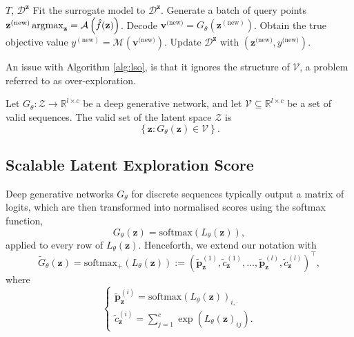\begin{algorithm}
\caption{Latent space optimisation.}\label{alg:lso}
\begin{algorithmic}
\Require $T$, $\mathcal{D}^{\mathbf{z}}$
\State Fit the surrogate model to $\mathcal{D}^{\mathbf{z}}$.
\State Generate a batch of query points $\mathbf{z}^{(\text{new})}\operatorname*{\mathrm{argmax}}_{\mathbf{z}}=\mathcal{A}\left(\hat{f}(\mathbf{z})\right)$.
\State Decode $\mathbf{v}^{\text{(new)}}=G_{\theta}\left(\mathbf{z}^{(\text{new})}\right)$.
\State Obtain the true objective value $y^{(\text{new})}=\mathcal{M}\left(\mathbf{v}^{\text{(new)}}\right)$.
\State Update $\mathcal{D}^\mathbf{z}$ with $\left(\mathbf{z}^{\text{(new)}},y^{\text{(new)}}\right)$.
\EndFor
\end{algorithmic}
\end{algorithm}

An issue with Algorithm \ref{alg:lso}, is that it ignores the structure of $\mathcal{V}$, a problem referred to as over-exploration.

\begin{definition}\label{def:latent_space_valid_set}
    Let $G_{\theta}:\mathcal{Z}\to\mathbb{R}^{l\times c}$ be a deep generative network, and let $\mathcal{V}\subseteq\mathbb{R}^{l\times c}$ be a set of valid sequences. The valid set of the latent space $\mathcal{Z}$ is $$\left\{\mathbf{z}:G_{\theta}(\mathbf{z})\in\mathcal{V}\right\}.$$
\end{definition}

\subsection{Scalable Latent Exploration Score}

Deep generative networks $G_{\theta}$ for discrete sequences typically output a matrix of logits, which are then transformed into normalised scores using the softmax function, $$G_{\theta}(\mathbf{z})=\mathrm{softmax}\left(L_{\theta}(\mathbf{z})\right),$$applied to every row of $L_{\theta}(\mathbf{z})$. Henceforth, we extend our notation with $$\tilde{G}_{\theta}(\mathbf{z})=\mathrm{softmax}_+\left(L_{\theta}(\mathbf{z})\right):=\left(\tilde{\mathbf{p}}_{\mathbf{z}}^{(1)},\tilde{c}_{\mathbf{z}}^{(1)},\dots,\tilde{\mathbf{p}}_{\mathbf{z}}^{(l)},\tilde{c}_{\mathbf{z}}^{(l)}\right)^\top,$$where $$\begin{cases}\tilde{\mathbf{p}}_{\mathbf{z}}^{(i)}=\mathrm{softmax}\left(L_{\theta}(\mathbf{z})\right)_{i,\cdot}\\\tilde{c}_{\mathbf{z}}^{(i)}=\sum_{j=1}^c\exp\left(L_{\theta}(\mathbf{z})_{ij}\right).\end{cases}$$

